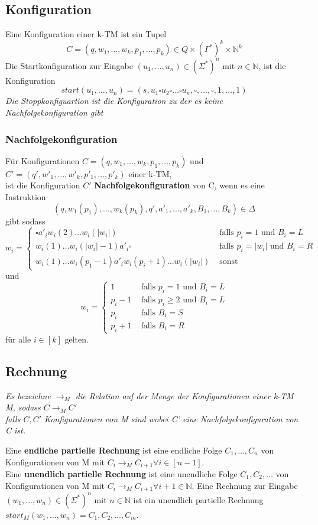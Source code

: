 \documentclass[DIV=15]{scrartcl}
\begin{document}
    \subsection{Konfiguration}
        Eine Konfiguration einer k-TM ist ein Tupel 
        \[C=(q,w_1,\dots,w_k,p_1,\dots,p_k)\in Q \times (\Gamma^*)^k \times \mathbb{N}^k\]
        Die Startkonfiguration zur Eingabe \((u_1,\dots,u_n)\in(\Sigma^*)^n\) mit \(n\in\mathbb{N}\), ist die Konfiguration
        \[start(u_1,\dots,u_n)=(s,u_1\square u_2\square\dots\square u_n,\square,\dots,\square,1,\dots,1)\]
        \textit{Die Stoppkonfiguartion ist die Konfiguration zu der es keine Nachfolgekonfiguration gibt}
    \subsubsection{Nachfolgekonfiguration}
        Für Konfigurationen \(C=(q,w_1,\dots,w_k,p_1,\dots,p_k)\) und \(C'=(q',w'_1,\dots,w'_k,p'_1,\dots,p'_k)\) einer k-TM, \\
        ist die Konfiguration \(C'\) \textbf{Nachfolgekonfiguration} von C, wenn es eine Instruktion 
        \[(q,w_1(p_1),\dots,w_k(p_k),q',a'_1,\dots,a'_k,B_1,\dots,B_k)\in\Delta\] 
        gibt sodass
        \[
        w_i = \begin{cases}
            \square a'_iw_i(2)\dots w_i(|w_i|) & \text{ falls } p_i=1 \text{ und } B_i=L\\
            w_i(1)\dots w_i(|w_i|-1)a'_i\square & \text{ falls } p_i=|w_i| \text{ und } B_i = R\\
            w_i(1)\dots w_i(p_1-1)a'_iw_i(p_i+1)\dots w_i(|w_i|) & \text{ sonst}
        \end{cases}    
        \]
        und 
        \[
        w_i = \begin{cases}
            1 & \text{ falls } p_i=1 \text{ und } B_i=L\\
            p_i-1 & \text{ falls } p_i \geq 2 \text{ und } B_i = L\\
            p_i & \text{ falls } B_i=S\\
            p_i+1 & \text{ falls } B_i=R
        \end{cases}    
        \]
        für alle \(i\in [k]\) gelten.
    \subsection{Rechnung}
        \textit{Es bezeichne \(\to _M\) die Relation auf der Menge der Konfigurationen einer k-TM M, sodass \(C\to _M C'\) \\
        falls \(C,C'\) Konfigurationen von M sind wobei C' eine Nachfolgekonfiguration von C ist.} \par\bigskip
        Eine \textbf{endliche partielle Rechnung} ist eine endliche Folge \(C_1,\dots,C_n\) von Konfigurationen von 
        M mit \(C_i\to _M C_{i+1}\forall i\in[n-1]\).\\
        Eine \textbf{unendlich partielle Rechnung} ist eine unendliche Folge \(C_1,C_2,\dots\) von Konfigurationen von 
        M mit \(C_i\to _M C_{i+1}\forall i+1\in\mathbb{N}\).
        Eine Rechnung zur Eingabe \((w_1,\dots,w_n)\in(\Sigma^*)^n\) mit \(n\in \mathbb{N}\) ist ein 
        unendlich partielle Rechnung \(start_M(w_1,\dots,w_n)=C_1,C_2,\dots,C_m\).
\end{document}
